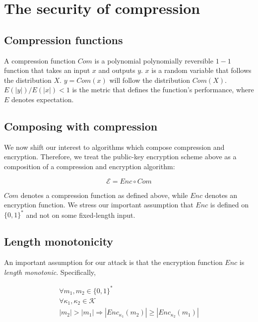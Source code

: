 \documentclass{article}
\begin{document}
\section{The security of compression}

\subsection{Compression functions}

A compression function $Com$ is a polynomial polynomially reversible $1 - 1$
function that takes an input $x$ and outputs $y$. $x$ is a random variable that
follows the distribution $X$. $y = Com(x)$ will follow the
distribution $Com(X)$.  $E(|y|) / E(|x|) < 1$ is the metric that defines the
function's performance, where $E$ denotes expectation.

\subsection{Composing with compression}

We now shift our interest to algorithms which compose compression and
encryption.  Therefore, we treat the public-key encryption scheme above as a
composition of a compression and encryption algorithm:

\begin{equation*}
    \mathcal{E} = Enc \circ Com
\end{equation*}

$Com$ denotes a compression function as defined above, while $Enc$ denotes an
encryption function. We stress our important assumption that $Enc$ is defined
on $\{0, 1\}^*$ and not on some fixed-length input.

\subsection{Length monotonicity}

An important assumption for our attack is that the encryption function $Enc$ is
\textit{length monotonic}. Specifically,

\begin{equation*}
\begin{split}
\forall m_1, m_2 \in \{0, 1\}^*\\
\forall \kappa_1, \kappa_2 \in \mathcal{K}\\
|m_2| > |m_1|
\Rightarrow
|Enc_{\kappa_1}(m_2)| \geq |Enc_{\kappa_2}(m_1)|
\end{split}
\end{equation*}
\end{document}
